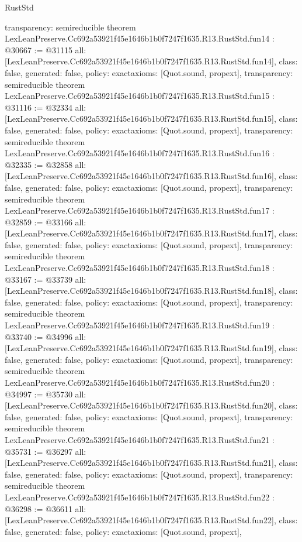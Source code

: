 \begin{lexlean}{RustStd}
\begin{coremodule}
{  transparency: semireducible
}
theorem LexLeanPreserve.Cc692a53921f45e1646b1b0f7247f1635.R13.RustStd.fun14 : @30667 := @31115 {
  all: [LexLeanPreserve.Cc692a53921f45e1646b1b0f7247f1635.R13.RustStd.fun14],
  class: false,
  generated: false,
  policy: exact{axioms: [Quot.sound, propext]},
  transparency: semireducible
}
theorem LexLeanPreserve.Cc692a53921f45e1646b1b0f7247f1635.R13.RustStd.fun15 : @31116 := @32334 {
  all: [LexLeanPreserve.Cc692a53921f45e1646b1b0f7247f1635.R13.RustStd.fun15],
  class: false,
  generated: false,
  policy: exact{axioms: [Quot.sound, propext]},
  transparency: semireducible
}
theorem LexLeanPreserve.Cc692a53921f45e1646b1b0f7247f1635.R13.RustStd.fun16 : @32335 := @32858 {
  all: [LexLeanPreserve.Cc692a53921f45e1646b1b0f7247f1635.R13.RustStd.fun16],
  class: false,
  generated: false,
  policy: exact{axioms: [Quot.sound, propext]},
  transparency: semireducible
}
theorem LexLeanPreserve.Cc692a53921f45e1646b1b0f7247f1635.R13.RustStd.fun17 : @32859 := @33166 {
  all: [LexLeanPreserve.Cc692a53921f45e1646b1b0f7247f1635.R13.RustStd.fun17],
  class: false,
  generated: false,
  policy: exact{axioms: [Quot.sound, propext]},
  transparency: semireducible
}
theorem LexLeanPreserve.Cc692a53921f45e1646b1b0f7247f1635.R13.RustStd.fun18 : @33167 := @33739 {
  all: [LexLeanPreserve.Cc692a53921f45e1646b1b0f7247f1635.R13.RustStd.fun18],
  class: false,
  generated: false,
  policy: exact{axioms: [Quot.sound, propext]},
  transparency: semireducible
}
theorem LexLeanPreserve.Cc692a53921f45e1646b1b0f7247f1635.R13.RustStd.fun19 : @33740 := @34996 {
  all: [LexLeanPreserve.Cc692a53921f45e1646b1b0f7247f1635.R13.RustStd.fun19],
  class: false,
  generated: false,
  policy: exact{axioms: [Quot.sound, propext]},
  transparency: semireducible
}
theorem LexLeanPreserve.Cc692a53921f45e1646b1b0f7247f1635.R13.RustStd.fun20 : @34997 := @35730 {
  all: [LexLeanPreserve.Cc692a53921f45e1646b1b0f7247f1635.R13.RustStd.fun20],
  class: false,
  generated: false,
  policy: exact{axioms: [Quot.sound, propext]},
  transparency: semireducible
}
theorem LexLeanPreserve.Cc692a53921f45e1646b1b0f7247f1635.R13.RustStd.fun21 : @35731 := @36297 {
  all: [LexLeanPreserve.Cc692a53921f45e1646b1b0f7247f1635.R13.RustStd.fun21],
  class: false,
  generated: false,
  policy: exact{axioms: [Quot.sound, propext]},
  transparency: semireducible
}
theorem LexLeanPreserve.Cc692a53921f45e1646b1b0f7247f1635.R13.RustStd.fun22 : @36298 := @36611 {
  all: [LexLeanPreserve.Cc692a53921f45e1646b1b0f7247f1635.R13.RustStd.fun22],
  class: false,
  generated: false,
  policy: exact{axioms: [Quot.sound, propext]},
}
\end{coremodule}
\end{lexlean}
